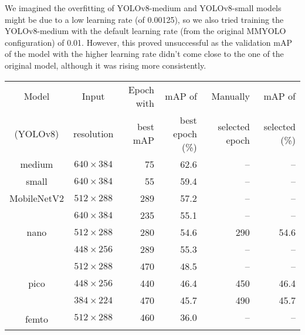 We imagined the overfitting of YOLOv8-medium and YOLOv8-small models might be
due to a low learning rate (of 0.00125), so we also tried training the
YOLOv8-medium with the default learning rate (from the original MMYOLO
configuration) of 0.01. However, this proved unsuccessful as the validation mAP
of the model with the higher learning rate didn't come close to the one of the
original model, although it was rising more consistently.

\begin{table}[t]
    \centering
    \small
    \begin{threeparttable}
        \begin{tabular}{|c|c|rr|rr|}
            \hline
            Model    & Input      & Epoch with & mAP of          & Manually       & mAP of        \\
            (YOLOv8) & resolution & best mAP   & best epoch (\%) & selected epoch & selected (\%) \\
            \hline
            \hline
            \multirow{1}{*}{medium}     & $640\times384$  &  75 & 62.6 &     -- & -- \\
            \hline                                          
            \multirow{1}{*}{small}      & $640\times384$  &  55 & 59.4 &     -- & -- \\
            \hline
            \multirow{1}{*}{MobileNetV2}& $512\times288$  & 289 & 57.2 &     -- & -- \\
            \hline                      
            \multirow{3}{*}{nano}       & $640\times384$  & 235 & 55.1 &     -- & -- \\
            \cline{2-6}
                                        & $512\times288$  & 280 & 54.6 & 290 & 54.6 \\
            \cline{2-6}
                                        & $448\times256$  & 289 & 55.3 &     -- & -- \\
            \hline
            \multirow{3}{*}{pico}       & $512\times288$  & 470 & 48.5 &     -- & -- \\
            \cline{2-6}
                                        & $448\times256$  & 440 & 46.4 & 450 & 46.4 \\
            \cline{2-6}
                                        & $384\times224$  & 470 & 45.7 & 490 & 45.7 \\
            \hline
            \multirow{4}{*}{femto}      & $512\times288$  & 460 & 36.0 &     -- & -- \\
            \cline{2-6}

\end{tabular}
\end{threeparttable}
\end{table}
